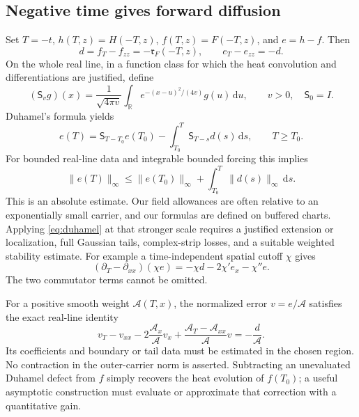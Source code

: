 \documentclass[11pt]{article}
\newcommand{\R}{\mathbb R}
\newcommand{\dd}{\,\mathrm d}
\numberwithin{equation}{section}
\begin{document}
\subsection{Negative time gives forward diffusion}
Set \(T=-t\), \(h(T,z)=H(-T,z)\), \(f(T,z)=F(-T,z)\), and
\(e=h-f\). Then
\begin{equation}
 d=f_T-f_{zz}=-\mathfrak r_F(-T,z),\qquad
 e_T-e_{zz}=-d. \label{eq:negative-error}
\end{equation}
On the whole real line, in a function class for which the heat
convolution and differentiations are justified, define
\[
 (\mathsf S_v g)(x)=\frac1{\sqrt{4\pi v}}
 \int_\R e^{-(x-u)^2/(4v)}g(u)\dd u,\qquad v>0,
 \quad \mathsf S_0=I.
\]
Duhamel's formula \cite[Section~2.7]{duhamel} yields
\begin{equation}
 e(T)=\mathsf S_{T-T_0}e(T_0)
      -\int_{T_0}^{T}\mathsf S_{T-s}d(s)\dd s,
      \qquad T\ge T_0. \label{eq:duhamel}
\end{equation}
For bounded real-line data and integrable bounded forcing this implies
\begin{equation}
 \|e(T)\|_\infty\le\|e(T_0)\|_\infty
                  +\int_{T_0}^T\|d(s)\|_\infty\dd s.
 \label{eq:absolute-stability}
\end{equation}
This is an absolute estimate. Our field allowances are often relative
to an exponentially small carrier, and our formulas are defined on
buffered charts. Applying \eqref{eq:duhamel} at that stronger scale
requires a justified extension or localization, full Gaussian tails,
complex-strip losses, and a suitable weighted stability estimate.
For example a time-independent spatial cutoff \(\chi\) gives
\[
 (\partial_T-\partial_{xx})(\chi e)
 =-\chi d-2\chi'e_x-\chi''e.
\]
The two commutator terms cannot be omitted.

For a positive smooth weight \(\mathcal A(T,x)\), the normalized
error \(v=e/\mathcal A\) satisfies the exact real-line identity
\begin{equation}
 v_T-v_{xx}-2\frac{\mathcal A_x}{\mathcal A}v_x
 +\frac{\mathcal A_T-\mathcal A_{xx}}{\mathcal A}v
 =-\frac d{\mathcal A}. \label{eq:weighted-error}
\end{equation}
Its coefficients and boundary or tail data must be estimated in the
chosen region. No contraction in the outer-carrier norm is asserted.
Subtracting an unevaluated Duhamel defect from \(f\) simply recovers
the heat evolution of \(f(T_0)\); a useful asymptotic construction
must evaluate or approximate that correction with a quantitative gain.
\end{document}
